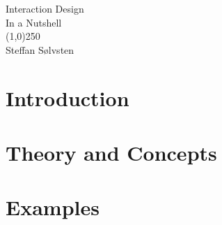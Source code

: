\documentclass[a4, english, twoside]{article}
\begin{document}

\thispagestyle{empty} %
\begin{center}
	\phantom{}\vspace{2.7cm}
	{\Huge\sc Interaction Design}
	\\ \vspace{1em}
	{\LARGE\sc In a Nutshell}
	\\
	\line(1,0){250}
	\\ \vspace{1em}
	{\LARGE Steffan Sølvsten}
\end{center}

\BgThispage

\newpage
\thispagestyle{empty} %
\tableofcontents

\newpage
\section{Introduction}
\label{sec:introduction}



\newpage
\section{Theory and Concepts}
\label{sec:1}








\newpage
\section{Examples}
\label{sec:2}


\end{document}
